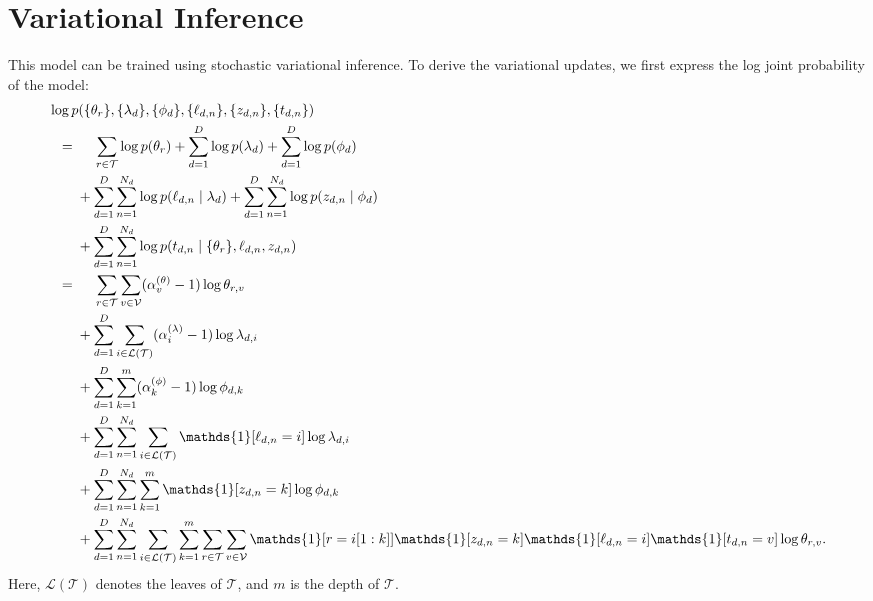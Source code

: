 \documentclass{article}
\newcommand{\indicator}{\mathds{1}}
\begin{document}
\section{Variational Inference}

\newcommand{\rPath}{{r \in \mathcal T}}
\newcommand{\vVocab}{{v \in \mathcal V}}
\newcommand{\iLeaf}{{i \in \mathcal L(\mathcal T)}}
\newcommand{\kDepth}{{k = 1}^{m}}
\newcommand{\kDepthSet}{{k \in \{1, \ldots, m\}}}
\newcommand{\nWordSlot}{{n = 1}^{N_d}}
\newcommand{\dDoc}{{d = 1}^D}
\newcommand{\softmax}{\mathop{\text{softmax}}}

This model can be trained using stochastic variational inference.
To derive the variational updates, we first express the log joint probability of the model:
\begin{align}
\MoveEqLeft
\log p(\{\theta_r\}, \{\lambda_d\}, \{\phi_d\}, \{\ell_{d,n}\}, \{z_{d,n}\}, \{t_{d,n}\}) \\
={}& \phantom{{}+{}} \sum_\rPath \log p(\theta_r) + \sum_\dDoc \log p(\lambda_d) + \sum_\dDoc \log p(\phi_d) \\
&+ \sum_\dDoc \sum_\nWordSlot \log p(\ell_{d,n} \mid \lambda_d) + \sum_\dDoc \sum_\nWordSlot \log p(z_{d,n} \mid \phi_d) \nonumber \\
&+ \sum_\dDoc \sum_\nWordSlot \log p(t_{d,n} \mid \{\theta_r\}, \ell_{d,n}, z_{d,n}) \nonumber \\
={}& \phantom{{}+{}} \sum_\rPath \sum_\vVocab (\alpha^{(\theta)}_v - 1) \log \theta_{r,v} \\
&+ \sum_\dDoc \sum_\iLeaf (\alpha^{(\lambda)}_i - 1) \log \lambda_{d,i} \nonumber \\
&+ \sum_\dDoc \sum_\kDepth (\alpha^{(\phi)}_k - 1) \log \phi_{d,k} \nonumber \\
&+ \sum_\dDoc \sum_\nWordSlot \sum_\iLeaf \indicator[\ell_{d,n} = i] \log \lambda_{d,i} \nonumber \\
&+ \sum_\dDoc \sum_\nWordSlot \sum_\kDepth \indicator[z_{d,n} = k] \log \phi_{d,k} \nonumber \\
&+ \sum_\dDoc \sum_\nWordSlot \sum_\iLeaf \sum_\kDepth \sum_\rPath \sum_\vVocab \indicator[r = i[1:k]] \indicator[z_{d,n} = k] \indicator[\ell_{d,n} = i] \indicator[t_{d,n} = v] \log \theta_{r,v}. \nonumber
\end{align}
Here, $\mathcal L(\mathcal T)$ denotes the leaves of $\mathcal T$, and $m$ is the depth of $\mathcal T$.
\end{document}
